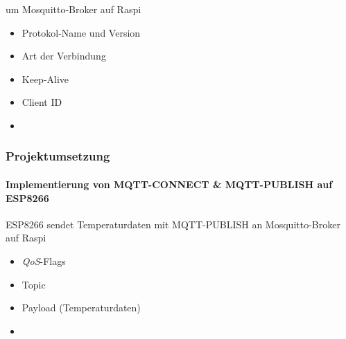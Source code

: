 \documentclass{beamer}
\begin{document}
\begin{frame}
um Mosquitto-Broker auf Raspi
\begin{itemize}
	\item Protokol-Name und Version
	\item Art der Verbindung
	\item Keep-Alive
	\item Client ID
	\item {}
	
\end{itemize}

\end{frame}

\begin{frame}

\frametitle{Projektumsetzung}
\framesubtitle{Implementierung von MQTT-CONNECT \& MQTT-PUBLISH auf ESP8266}
ESP8266 sendet Temperaturdaten mit MQTT-PUBLISH an Mosquitto-Broker auf Raspi
\begin{itemize}
	\item \textit{QoS}-Flags
	\item Topic
	\item Payload (Temperaturdaten)
	\item {}
	
\end{itemize}

\end{frame}


\end{document}
